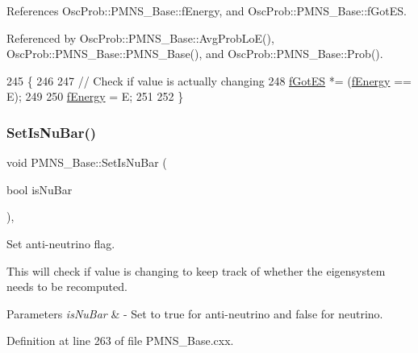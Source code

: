 References Osc\+Prob\+::\+P\+M\+N\+S\+\_\+\+Base\+::f\+Energy, and Osc\+Prob\+::\+P\+M\+N\+S\+\_\+\+Base\+::f\+Got\+ES.



Referenced by Osc\+Prob\+::\+P\+M\+N\+S\+\_\+\+Base\+::\+Avg\+Prob\+Lo\+E(), Osc\+Prob\+::\+P\+M\+N\+S\+\_\+\+Base\+::\+P\+M\+N\+S\+\_\+\+Base(), and Osc\+Prob\+::\+P\+M\+N\+S\+\_\+\+Base\+::\+Prob().


\begin{DoxyCode}
245 \{
246 
247   \textcolor{comment}{// Check if value is actually changing}
248   \hyperlink{classOscProb_1_1PMNS__Base_a6dc5cd010d2d70b2324745b4e53e9839}{fGotES} *= (\hyperlink{classOscProb_1_1PMNS__Base_a2800af6d436972f3e900867790c046b0}{fEnergy} == E);
249 
250   \hyperlink{classOscProb_1_1PMNS__Base_a2800af6d436972f3e900867790c046b0}{fEnergy} = E;
251 
252 \}
\end{DoxyCode}
\mbox{\label{classOscProb_1_1PMNS__Base_a717e0348cf762f3961854e332a9b52e0}} 
\subsubsection{\texorpdfstring{Set\+Is\+Nu\+Bar()}{SetIsNuBar()}}
{\footnotesize\ttfamily void P\+M\+N\+S\+\_\+\+Base\+::\+Set\+Is\+Nu\+Bar (\begin{DoxyParamCaption}\item[{bool}]{is\+Nu\+Bar }\end{DoxyParamCaption})\hspace{0.3cm}{\ttfamily [virtual]}, {\ttfamily [inherited]}}

Set anti-\/neutrino flag.

This will check if value is changing to keep track of whether the eigensystem needs to be recomputed.


\begin{DoxyParams}{Parameters}
{\em is\+Nu\+Bar} & -\/ Set to true for anti-\/neutrino and false for neutrino. \\
\hline
\end{DoxyParams}


Definition at line 263 of file P\+M\+N\+S\+\_\+\+Base.\+cxx.



